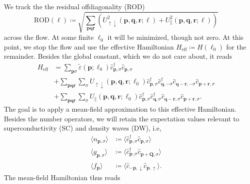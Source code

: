 \documentclass{article}
\begin{document}
We track the the residual offdiagonality (ROD)
\begin{equation}
  \mathrm{ROD} (\ell) \coloneqq \sqrt{\sum_{\mathbf{p} \mathbf{q} \mathbf{r}} \left( U_{\uparrow \downarrow}^2 (\mathbf{p}, \mathbf{q}, \mathbf{r}; \ell) + U_{\parallel}^2 (\mathbf{p}, \mathbf{q}, \mathbf{r}; \ell) \right)}
\end{equation}
across the flow.
At some finite $\ell_0$ it will be minimized, though not zero.
At this point, we stop the flow and use the effective Hamiltonian $H_\mathrm{eff} \coloneqq H(\ell_0)$ for the remainder.
Besides the global constant, which we do not care about, it reads
\begin{align}
  H_\mathrm{eff} &= \sum_{\mathbf{p} \sigma} \tilde{\varepsilon}(\mathbf{p}; \ell_0) \hat{c}_{ \mathbf{p}, \sigma }^\dagger \hat{c}_{ \mathbf{p}, \sigma }^{\phantom{\dagger}} \\
    &+ \sum_{ \mathbf{p} \mathbf{q} \mathbf{r} } \sum_{ \sigma } U_{ \uparrow \downarrow }( \mathbf{p}, \mathbf{q}, \mathbf{r}; \ell_0 )   \hat{c}_{ \mathbf{p}, \sigma }^\dagger  \hat{c}_{ \mathbf{q}, -\sigma }^\dagger  \hat{c}_{ \mathbf{q}-\mathbf{r}, -\sigma }^{\phantom{\dagger}} \hat{c}_{ \mathbf{p}+\mathbf{r}, \sigma }^{\phantom{\dagger}} \\
    &+ \sum_{ \mathbf{p} \mathbf{q} \mathbf{r} } \sum_{ \sigma } U_{ \parallel }( \mathbf{p}, \mathbf{q}, \mathbf{r}; \ell_0 )   \hat{c}_{ \mathbf{p}, \sigma }^\dagger  \hat{c}_{ \mathbf{q}, \sigma }^\dagger  \hat{c}_{ \mathbf{q}-\mathbf{r}, \sigma }^{\phantom{\dagger}} \hat{c}_{ \mathbf{p}+\mathbf{r}, \sigma }^{\phantom{\dagger}} .
\end{align}
The goal is to apply a mean-field approximation to this effective Hamiltonian.
Besides the number operators, we will retain the expectation values relevant to superconductivity (SC) and density waves (DW), i.e,
\begin{align}
  \langle n_{\mathbf{p},\sigma} \rangle &\coloneqq \langle \hat{c}_{ \mathbf{p}, \sigma }^\dagger \hat{c}_{ \mathbf{p}, \sigma }^{\phantom{\dagger}} \rangle \\
  \langle g_{\mathbf{p},\sigma} \rangle &\coloneqq \langle \hat{c}_{ \mathbf{p}, \sigma }^\dagger \hat{c}_{ \mathbf{p} + \mathbf{Q}, \sigma }^{\phantom{\dagger}} \rangle \\
  \langle f_\mathbf{p} \rangle &\coloneqq \langle \hat{c}_{ -\mathbf{p}, \downarrow }^{\phantom{\dagger}} \hat{c}_{ \mathbf{p}, \uparrow }^{\phantom{\dagger}} \rangle.
\end{align}
The mean-field Hamiltonian thus reads
\end{document}
